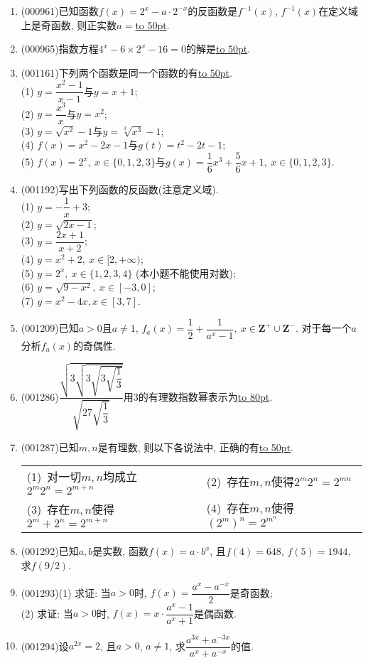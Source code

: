 \documentclass[10pt,a4paper]{article}
\newcommand{\blank}[1]{\underline{\hbox to #1pt{}}}
\newcommand{\vartwoch}[4]{\par\begin{tabular}{p{.46\textwidth}p{.46\textwidth}}
(1)~#1& (2)~#2\\
(3)~#3& (4)~#4
\end{tabular}}
\begin{document}
\begin{enumerate}[1.]
\item {\tiny (000961)}已知函数$f(x)=2^x-a\cdot 2^{-x}$的反函数是$f^{-1}(x)$, $f^{-1}(x)$在定义域上是奇函数, 则正实数$a=$\blank{50}.
\item {\tiny (000965)}指数方程$4^x-6 \times 2^x-16=0$的解是\blank{50}.
\item {\tiny (001161)}下列两个函数是同一个函数的有\blank{50}.\\ 
(1) $y=\dfrac{x^2-1}{x-1}$与$y=x+1$;\\ 
(2) $y=\dfrac{x^3}{x}$与$y=x^2$;\\ 
(3) $y=\sqrt{x^2}-1$与$y=\sqrt[3]{x^3}-1$;\\ 
(4) $f(x)=x^2-2x-1$与$g(t)=t^2-2t-1$;\\ 
(5) $f(x)=2^x, \ x \in \{0,1,2,3\}$与$g(x)=\dfrac16x^3+\dfrac56x+1, \ x \in \{0,1,2,3\}$.
\item {\tiny (001192)}写出下列函数的反函数(注意定义域).\\ 
(1) $y=-\dfrac{1}{x}+3$;\\ 
(2) $y=\sqrt{2x-1}$;\\ 
(3) $y=\dfrac{2x+1}{x+2}$;\\ 
(4) $y=x^2+2, \ x\in [2,+\infty)$;\\ 
(5) $y=2^x, \ x\in \{1,2,3,4\}$ (本小题不能使用对数);\\ 
(6) $y=\sqrt{9-x^2}, \ x\in [-3,0]$;\\ 
(7) $y=x^2-4x, x \in [3,7]$.
\item {\tiny (001209)}已知$a>0$且$a\ne 1$, $f_a(x)=\dfrac{1}{2}+\dfrac{1}{a^x-1},\ x \in \mathbf{Z}^+\cup \mathbf{Z}^-$. 对于每一个$a$分析$f_a(x)$的奇偶性.
\item {\tiny (001286)}$\dfrac{\sqrt{3\sqrt{3\sqrt{3\sqrt{\dfrac{1}{3}}}}}}{\sqrt{27\sqrt{\dfrac{1}{3}}}}$用$3$的有理数指数幂表示为\blank{80}.
\item {\tiny (001287)}已知$m,n$是有理数, 则以下各说法中, 正确的有\blank{50}.
\vartwoch{对一切$m,n$均成立$2^m2^n=2^{m+n}$}{存在$m,n$使得$2^m2^n=2^{mn}$}{存在$m,n$使得$2^m+2^n=2^{m+n}$}{存在$m,n$使得$(2^m)^n=2^{m^n}$}
\item {\tiny (001292)}已知$a,b$是实数, 函数$f(x)=a\cdot b^x$, 且$f(4)=648$, $f(5)=1944$, 求$f(9/2)$.
\item {\tiny (001293)}(1) 求证: 当$a>0$时, $f(x)=\dfrac{a^x-a^{-x}}{2}$是奇函数;\\ 
(2) 求证: 当$a>0$时, $f(x)=x\cdot \dfrac{a^x-1}{a^x+1}$是偶函数.
\item {\tiny (001294)}设$a^{2x}=2$, 且$a>0$, $a \ne 1$, 求$\dfrac{a^{3x}+a^{-3x}}{a^x+a^{-x}}$的值.

\end{enumerate}
\end{document}
